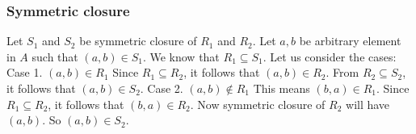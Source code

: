\documentclass{article}
\begin{document}
\subsubsection{Symmetric closure}
Let $S_1$ and $S_2$ be symmetric closure of $R_1$ and $R_2$. Let $a,b$
be arbitrary element in $A$ such that $(a,b) \in S_1$. We know that
$R_1 \subseteq S_1$. Let us consider the cases:
Case 1. $(a,b) \in R_1$ Since $R_1 \subseteq R_2$, it follows that
$(a,b) \in R_2$. From $R_2 \subseteq S_2$, it follows that $(a,b) \in
S_2$.
Case 2. $(a,b) \notin R_1$ This means $(b,a) \in R_1$. Since $R_1
\subseteq R_2$, it follows that $(b,a) \in R_2$. Now symmetric closure
of $R_2$ will have $(a,b)$. So $(a,b) \in S_2$.
\end{document}
